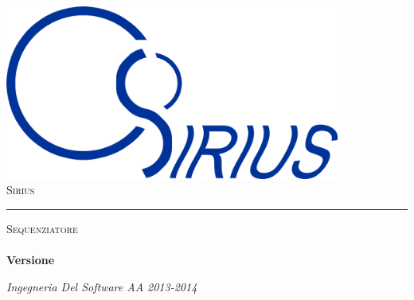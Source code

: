 \begin{titlepage}
 \begin{center}
     \includegraphics[width=11cm]{../modello/img/sirius}\\
     \vspace{1em}
     {\LARGE \textsc{Sirius}}\\
     \vspace{2em} \hrule \vspace{2em}
     {\Large \textsc{Sequenziatore}}\\
     \vspace{8em}
     {\LARGE \LARGE \LARGE \textbf{\doctitle}}\\
     \vspace{2em}
     {\LARGE \LARGE \LARGE \textbf{Versione \lastversion }}\\
     \vspace{4em}
 \end{center}


\vskip 1.8cm
\begin{center}
\textit{Ingegneria Del Software AA 2013-2014}
\end{center}

\end{titlepage}


